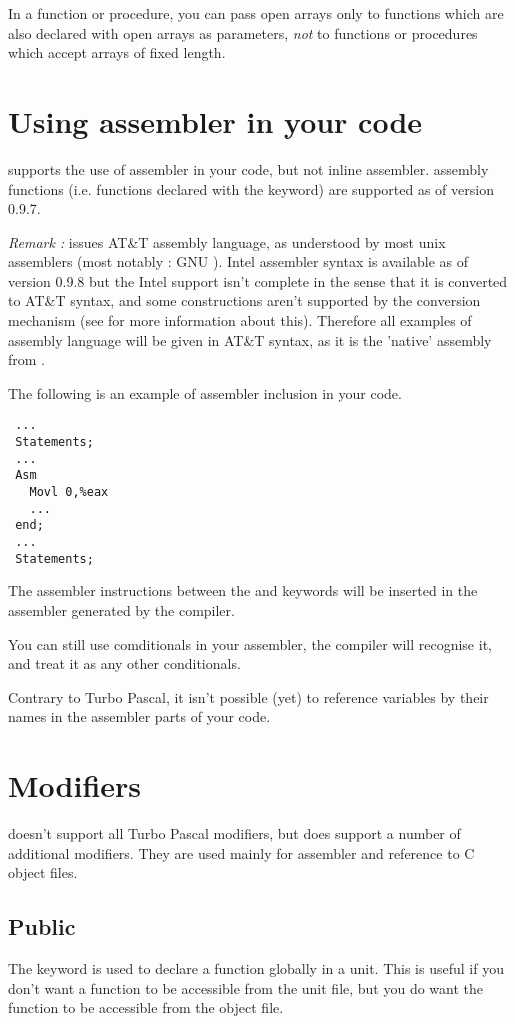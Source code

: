 \documentclass{report}
\begin{document}
In a function or procedure, you can pass open arrays only to functions which 
are also declared with open arrays as parameters, {\em not} to functions or 
procedures which accept arrays of fixed length.

\section{Using assembler in your code}
\fpc supports the use of assembler in your code, but not inline
assembler. assembly functions (i.e. functions declared with the
 keyword) are supported as of version 0.9.7.

{\em Remark :}
\fpc issues AT\&T assembly language, as understood by most
unix assemblers (most notably : GNU ). 
Intel assembler syntax is available as of version 0.9.8 but the Intel
support isn't complete in the sense that it is converted to AT\&T syntax,
and some constructions aren't supported by the conversion mechanism (see
\progref for more information about this).
Therefore all examples of assembly language will be given in AT\&T syntax,
as it is the 'native' assembly from \fpc.

The following is an example of assembler inclusion in your code.
\begin{verbatim}
 ...
 Statements;
 ...
 Asm
   Movl 0,%eax
   ...
 end;
 ...
 Statements;
\end{verbatim}
The assembler instructions between the  and  keywords will
be inserted in the assembler generated by the compiler.

You can still use comditionals in your assembler, the compiler will
recognise it, and treat it as any other conditionals.

Contrary to Turbo Pascal, it isn't possible (yet) to reference variables by 
their names in the assembler parts of your code.

\section{Modifiers}
\fpc doesn't support all Turbo Pascal modifiers, but
does support a number of additional modifiers. They are used mainly for assembler and
reference to C object files. 

\subsection{Public}
The  keyword is used to declare a function globally in a unit.
This is useful if you don't want a function to be accessible from the unit
file, but you do want the function to be accessible from the object file.
\end{document}
